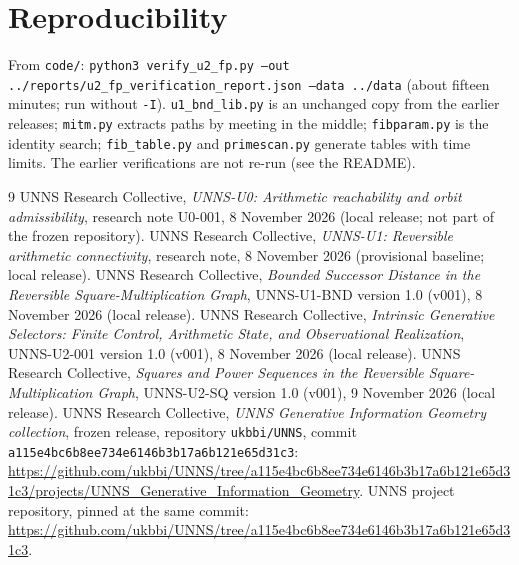 \documentclass[11pt]{article}
\theoremstyle{definition}
\begin{document}
\appendix\section{Reproducibility}
From \texttt{code/}: \texttt{python3 verify\_u2\_fp.py --out ../reports/u2\_fp\_verification\_report.json --data ../data} (about fifteen minutes; run without \texttt{-I}). \texttt{u1\_bnd\_lib.py} is an unchanged copy from the earlier releases; \texttt{mitm.py} extracts paths by meeting in the middle; \texttt{fibparam.py} is the identity search; \texttt{fib\_table.py} and \texttt{primescan.py} generate tables with time limits. The earlier verifications are not re-run (see the README).

\begin{thebibliography}{9}
 UNNS Research Collective, \emph{UNNS-U0: Arithmetic reachability and orbit admissibility}, research note U0-001, 8 November 2026 (local release; not part of the frozen repository).
 UNNS Research Collective, \emph{UNNS-U1: Reversible arithmetic connectivity}, research note, 8 November 2026 (provisional baseline; local release).
 UNNS Research Collective, \emph{Bounded Successor Distance in the Reversible Square-Multiplication Graph}, UNNS-U1-BND version 1.0 (v001), 8 November 2026 (local release).
 UNNS Research Collective, \emph{Intrinsic Generative Selectors: Finite Control, Arithmetic State, and Observational Realization}, UNNS-U2-001 version 1.0 (v001), 8 November 2026 (local release).
 UNNS Research Collective, \emph{Squares and Power Sequences in the Reversible Square-Multiplication Graph}, UNNS-U2-SQ version 1.0 (v001), 9 November 2026 (local release).
 UNNS Research Collective, \emph{UNNS Generative Information Geometry collection}, frozen release, repository \texttt{ukbbi/UNNS}, commit \texttt{a115e4bc6b8ee734e6146b3b17a6b121e65d31c3}:
\url{https://github.com/ukbbi/UNNS/tree/a115e4bc6b8ee734e6146b3b17a6b121e65d31c3/projects/UNNS_Generative_Information_Geometry}.
 UNNS project repository, pinned at the same commit:
\url{https://github.com/ukbbi/UNNS/tree/a115e4bc6b8ee734e6146b3b17a6b121e65d31c3}.
\end{thebibliography}
\end{document}
